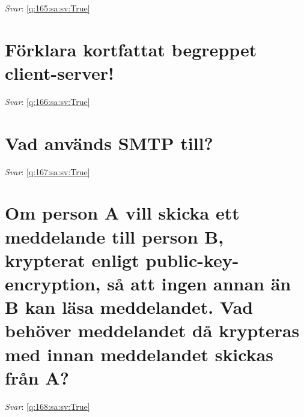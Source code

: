 \documentclass[a4paper,11pt,oneside]{book}
\begin{document}
\begin{sloppypar}
\vspace{2cm}

\noindent\makebox[\textwidth]{\hrulefill}

\vspace{1cm}

\textit{Svar}: \autoref{q:165:sa:sv:True}



\section{F\"orklara kortfattat begreppet client-server!}

\label{q:166:sa:sv:False}

\vspace{2cm}

\noindent\makebox[\textwidth]{\hrulefill}

\vspace{1cm}

\textit{Svar}: \autoref{q:166:sa:sv:True}



\section{Vad anv\"ands SMTP till?}

\label{q:167:sa:sv:False}

\vspace{2cm}

\noindent\makebox[\textwidth]{\hrulefill}

\vspace{1cm}

\textit{Svar}: \autoref{q:167:sa:sv:True}



\section{Om person A vill skicka ett meddelande till person B, krypterat enligt public-key-encryption, s\r{a} att ingen annan \"an B kan l\"asa meddelandet. Vad beh\"over meddelandet d\r{a} krypteras med innan meddelandet skickas fr\r{a}n A?}

\label{q:168:sa:sv:False}

\vspace{2cm}

\noindent\makebox[\textwidth]{\hrulefill}

\vspace{1cm}

\textit{Svar}: \autoref{q:168:sa:sv:True}




\end{sloppypar}
\end{document}
